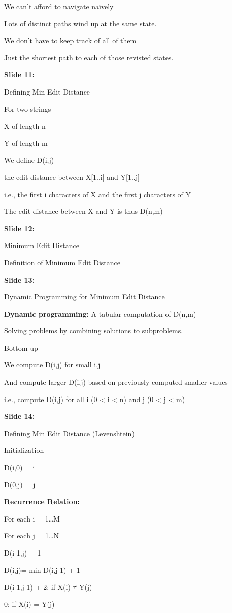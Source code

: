 \documentclass[11pt,a4paper]{article}
\begin{document}
We can’t afford to navigate naïvely

Lots of distinct paths wind up at the same state.

We don’t have to keep track of all of them

Just the shortest path to each of those revisted states.

\textbf{Slide 11:}

Defining Min Edit Distance

For two strings

X of length n

Y of length m

We define D(i,j)

the edit distance between X[1..i] and Y[1..j]

i.e., the first i characters of X and the first j characters of Y

The edit distance between X and Y is thus D(n,m)

\textbf{Slide 12:}

Minimum Edit Distance

Definition of Minimum Edit Distance

\textbf{Slide 13:}

Dynamic Programming for Minimum Edit Distance

\textbf{Dynamic programming:}  A tabular computation of D(n,m)

Solving problems by combining solutions to subproblems.

Bottom-up

We compute D(i,j) for small i,j

And compute larger D(i,j) based on previously computed smaller values

i.e., compute D(i,j) for all i (0 < i < n)  and j (0 < j < m)

\textbf{Slide 14:}

Defining Min Edit Distance (Levenshtein)

Initialization

D(i,0) = i

D(0,j) = j

\textbf{Recurrence Relation:} 

For each  i = 1…M

For each  j = 1…N

D(i-1,j) + 1

D(i,j)= min   D(i,j-1) + 1

D(i-1,j-1) +   2;  if X(i) ≠ Y(j)

0;  if X(i) = Y(j)
\end{document}
